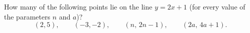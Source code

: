 How many of the following points lie on the line $y=2x+1$ (for every value of the parameters $n$ and $a$)?
\[(2,5),\qquad(-3,-2),\qquad(n,\,2n-1),\qquad(2a,\,4a+1).\]
